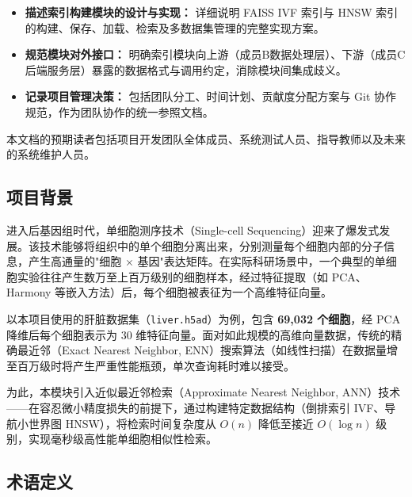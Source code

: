 \documentclass[a4paper]{article}
\begin{document}
\begin{itemize}
    \item \textbf{描述索引构建模块的设计与实现：} 详细说明 FAISS IVF 索引与 HNSW 索引的构建、保存、加载、检索及多数据集管理的完整实现方案。
    \item \textbf{规范模块对外接口：} 明确索引模块向上游（成员B数据处理层）、下游（成员C后端服务层）暴露的数据格式与调用约定，消除模块间集成歧义。
    \item \textbf{记录项目管理决策：} 包括团队分工、时间计划、贡献度分配方案与 Git 协作规范，作为团队协作的统一参照文档。
\end{itemize}

本文档的预期读者包括项目开发团队全体成员、系统测试人员、指导教师以及未来的系统维护人员。

\subsection{项目背景}
进入后基因组时代，单细胞测序技术（Single-cell Sequencing）迎来了爆发式发展。该技术能够将组织中的单个细胞分离出来，分别测量每个细胞内部的分子信息，产生高通量的"细胞 $\times$ 基因"表达矩阵。在实际科研场景中，一个典型的单细胞实验往往产生数万至上百万级别的细胞样本，经过特征提取（如 PCA、Harmony 等嵌入方法）后，每个细胞被表征为一个高维特征向量。

以本项目使用的肝脏数据集（\texttt{liver.h5ad}）为例，包含 \textbf{69,032 个细胞}，经 PCA 降维后每个细胞表示为 30 维特征向量。面对如此规模的高维向量数据，传统的精确最近邻（Exact Nearest Neighbor, ENN）搜索算法（如线性扫描）在数据量增至百万级时将产生严重性能瓶颈，单次查询耗时难以接受。

为此，本模块引入近似最近邻检索（Approximate Nearest Neighbor, ANN）技术——在容忍微小精度损失的前提下，通过构建特定数据结构（倒排索引 IVF、导航小世界图 HNSW），将检索时间复杂度从 $O(n)$ 降低至接近 $O(\log n)$ 级别，实现毫秒级高性能单细胞相似性检索。

\subsection{术语定义}
\end{document}
